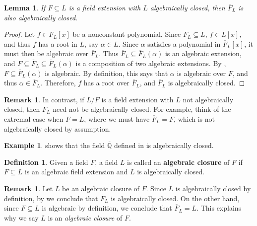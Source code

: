 \documentclass[12pt]{report}
\newtheorem{lemma}[theorem]{Lemma}
\numberwithin{equation}{section}
\numberwithin{theorem}{chapter}
\theoremstyle{definition}
\newtheorem{definition}[theorem]{Definition}
\newtheorem{example}[theorem]{Example}
\newtheorem*{basic properties}{Basic Properties}
\newtheorem*{Important Remark}{Important Remark}
\newtheorem{remark}[theorem]{Remark}
\newcommand{\df}[1]{{\bf #1}\index{#1}}
\newcommand{\Q}{\mathbb{Q}}
\begin{document}
\begin{lemma}\label{remark alg closure is algclosed}
	If $F \subseteq L$ is a field extension with $L$ algebraically closed, then $\overline{F}_L$ is also algebraically closed.
\end{lemma}

\begin{proof}
Let $f \in \overline{F}_L[x]$ be a nonconstant polynomial. Since $\overline{F}_L \subseteq L$, $f \in L[x]$, and thus $f$ has a root in $L$, say $\alpha \in L$. Since $\alpha$ satisfies a polynomial in $\overline{F}_L[x]$, it must then be algebraic over $\overline{F}_L$. Thus $\overline{F}_L \subseteq \overline{F}_L(\alpha)$ is an algebraic extension, and $F \subseteq \overline{F}_L \subseteq \overline{F}_L(\alpha)$ is a composition of two algebraic extensions. By , $F \subseteq \overline{F}_L(\alpha)$ is algebraic. By definition, this says that $\alpha$ is algebraic over $F$, and thus $\alpha \in \overline{F}_L$. Therefore, $f$ has a root over $\overline{F}_L$, and $\overline{F}_L$ is algebraically closed.
\end{proof}


\begin{remark}\label{remark alg closure inside not alg closed field}
In contrast, if $L/F$ is a field extension with $L$ not algebraically closed, then $\overline{F}_L$ need not be algebraically closed. For example, think of the extremal case when $F=L$, where we must have $\overline{F}_L=F$, which is not algebraically closed by assumption.
\end{remark}



\begin{example}
	 shows that the field $\overline{\Q}$ defined in  is algebraically closed.
\end{example}




\begin{definition}
Given a field $F$, a field $L$ is called an \df{algebraic closure} of $F$ if $F \subseteq L$ is an algebraic field extension and $L$ is algebraically closed.
\end{definition}

\begin{remark}
	Let $L$ be an algebraic closure of $F$. Since $L$ is algebraically closed by definition, by  we conclude that $\overline{F}_L$ is algebraically closed. On the other hand, since $F \subseteq L$ is algebraic by definition, we conclude that $\overline{F}_L = L$. This explains why we say $L$ is an \emph{algebraic closure} of $F$.
\end{remark}
\end{document}
